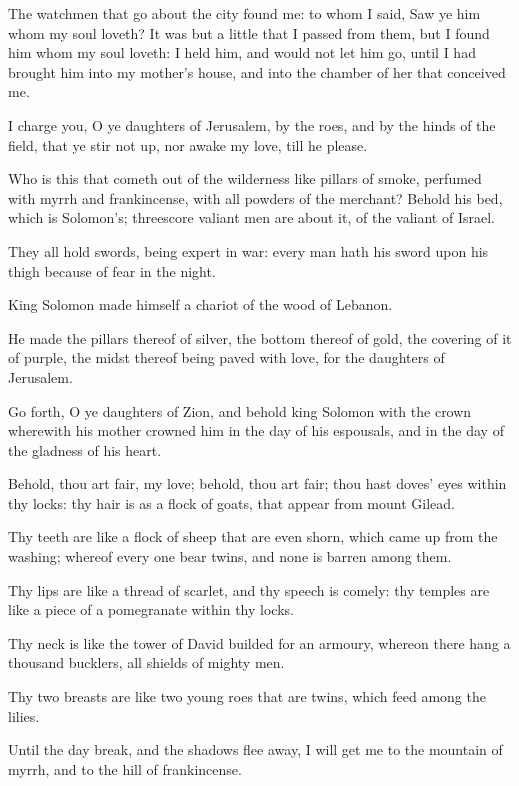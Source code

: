 \Verse The watchmen that go about the city found me: to whom I said, Saw ye him whom my soul loveth?  \Verse It was but a little that I passed from them, but I found him whom my soul loveth: I held him, and would not let him go, until I had brought him into my mother's house, and into the chamber of her that conceived me.

\Verse I charge you, O ye daughters of Jerusalem, by the roes, and by the hinds of the field, that ye stir not up, nor awake my love, till he please.

\Verse Who is this that cometh out of the wilderness like pillars of smoke, perfumed with myrrh and frankincense, with all powders of the merchant?  \Verse Behold his bed, which is Solomon's; threescore valiant men are about it, of the valiant of Israel.

\Verse They all hold swords, being expert in war: every man hath his sword upon his thigh because of fear in the night.

\Verse King Solomon made himself a chariot of the wood of Lebanon.

\Verse He made the pillars thereof of silver, the bottom thereof of gold, the covering of it of purple, the midst thereof being paved with love, for the daughters of Jerusalem.

\Verse Go forth, O ye daughters of Zion, and behold king Solomon with the crown wherewith his mother crowned him in the day of his espousals, and in the day of the gladness of his heart.


\Chapter
\Verse Behold, thou art fair, my love; behold, thou art fair; thou hast doves' eyes within thy locks: thy hair is as a flock of goats, that appear from mount Gilead.

\Verse Thy teeth are like a flock of sheep that are even shorn, which came up from the washing; whereof every one bear twins, and none is barren among them.

\Verse Thy lips are like a thread of scarlet, and thy speech is comely: thy temples are like a piece of a pomegranate within thy locks.

\Verse Thy neck is like the tower of David builded for an armoury, whereon there hang a thousand bucklers, all shields of mighty men.

\Verse Thy two breasts are like two young roes that are twins, which feed among the lilies.

\Verse Until the day break, and the shadows flee away, I will get me to the mountain of myrrh, and to the hill of frankincense.

